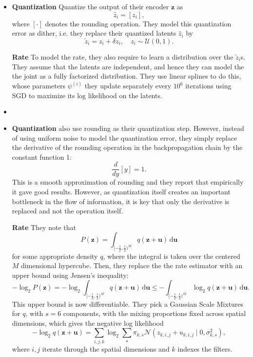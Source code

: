 \documentclass{article}
\renewcommand{\vec}[1]{\mathbf{#1}}
\renewcommand{\d}{\,\text{d}}
\newcommand{\Norm}[1]{\mathcal{N}\left( #1 \right)}
\newcommand{\Unif}[1]{\mathcal{U}\left( #1 \right)}
\begin{document}
\begin{itemize}
\item
  \textbf{Quantization }
  \cite{balle2016end} Quantize the output of their encoder $\vec{z}$ as
  \[
    \hat{z}_i = [z_i], 
  \]
  where $[\cdot]$ denotes the rounding operation. They model this 
  quantization error as dither, i.e. they replace their quantized latents
  $\hat{z}_i$ by
  \[
    \tilde{z}_i = z_i + \delta z_i, \quad z_i \sim \Unif{0, 1}. 
  \]
  \par \textbf{Rate }
  To model the rate, they also require to learn a distribution over the
  $\tilde{z}_i$s. They assume that the latents are independent, and hence they
  can model the the joint as a fully factorized distribution. They use linear
  splines to do this, whose parameters $\psi^{(i)}$ they update separately every
  $10^6$ iterations using SGD to maximize its log likelihood on the latents.

\item \cite{toderici2017full}
\item
  \textbf{Quantization }
  \cite{theis2017lossy} also use rounding as their quantization step.
  However, instead of using uniform noise to model the quantization error, they
  simply replace the derivative of the rounding operation in the backpropagation
  chain by the constant function 1:
  \[
    \frac{d}{d y} [y] = 1.
  \]
  This is a smooth approximation of rounding and they report that empirically it
  gave good results. However, as quantization itself creates an important
  bottleneck in the flow of information, it is key that only the derivative is
  replaced and not the operation itself.
  \par \textbf{Rate }
  They note that
  \[
    P(\vec{z}) = \int_{[-\frac{1}{2}, \frac{1}{2})^M} q(\vec{z} + \vec{u}) \d \vec{u}
  \]
  for some appropriate density $q$,
  where the integral is taken over the centered $M$ dimensional hypercube.
  Then, they replace the the rate estimator with an upper bound using Jensen's
  inequality:
  \[
    -\log_2P(\vec{z}) = -\log_2\int_{[-\frac{1}{2}, \frac{1}{2})^M} q(\vec{z} +
    \vec{u}) \d \vec{u} \leq -\int_{[-\frac{1}{2}, \frac{1}{2})^M} \log_2q(\vec{z} +
    \vec{u}) \d \vec{u}.
  \]
  This upper bound is now differentiable. They pick a Gaussian Scale Mixtures for
  $q$, with $s = 6$ components, with the mixing proportions fixed across spatial
  dimensions, which gives the negative log likelihood
  \[
    -\log_2 q(\vec{z} + \vec{u}) =
    \sum_{i, j, k} \log_2 \sum_s \pi_{k, s} \Norm{z_{k,i,j} + u_{k, i, j} \mid
    0, \sigma_{k, s}^2},
  \]
  where $i,j$ iterate through the spatial dimensions and $k$ indexes the filters.
  

\end{itemize}
\end{document}

